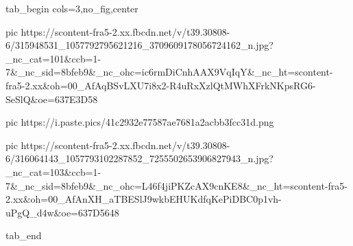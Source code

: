  
 
 
 
 

\ifcmt
  tab_begin cols=3,no_fig,center

     pic https://scontent-fra5-2.xx.fbcdn.net/v/t39.30808-6/315948531_1057792795621216_3709609178056724162_n.jpg?_nc_cat=101&ccb=1-7&_nc_sid=8bfeb9&_nc_ohc=ic6rmDiCnhAAX9VqIqY&_nc_ht=scontent-fra5-2.xx&oh=00_AfAqBSvLXU7i8x2-R4uRxXzlQtMWhXFrkNKpsRG6-SeSlQ&oe=637E3D58

     pic https://i.paste.pics/41c2932e77587ae7681a2acbb3fcc31d.png

     pic https://scontent-fra5-2.xx.fbcdn.net/v/t39.30808-6/316064143_1057793102287852_7255502653906827943_n.jpg?_nc_cat=103&ccb=1-7&_nc_sid=8bfeb9&_nc_ohc=L46f4jiPKZcAX9cnKE8&_nc_ht=scontent-fra5-2.xx&oh=00_AfAnXH_aTBESlJ9wkbEHUKdfqKePiDBC0p1vh-uPgQ_d4w&oe=637D5648

  tab_end
\fi
